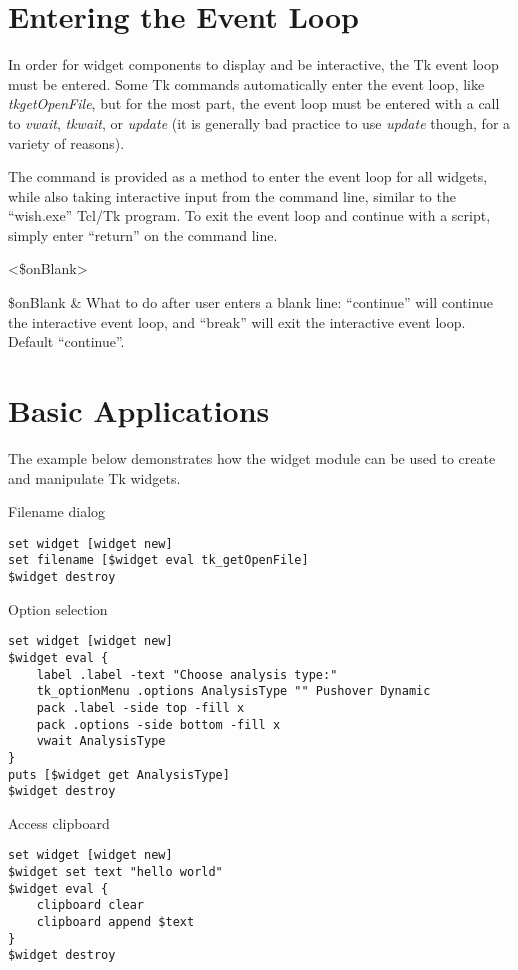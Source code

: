 \documentclass{article}
\renewcommand{\^}[1]{\textsuperscript{#1}}
\renewcommand{\_}[1]{\textsubscript{#1}}
\begin{document}
\section{Entering the Event Loop}
In order for widget components to display and be interactive, the Tk event loop must be entered. 
Some Tk commands automatically enter the event loop, like \textit{tk\textunderscore getOpenFile}, but for the most part, the event loop must be entered with a call to \textit{vwait}, \textit{tkwait}, or \textit{update} (it is generally bad practice to use \textit{update} though, for a variety of reasons). 

The command  is provided as a method to enter the event loop for all widgets, while also taking interactive input from the command line, similar to the ``wish.exe'' Tcl/Tk program.
To exit the event loop and continue with a script, simply enter ``return'' on the command line.
\begin{syntax}
   	 <\$onBlank>
\end{syntax}
\begin{args}
   	\$onBlank & What to do after user enters a blank line: ``continue'' will continue the interactive event loop, and ``break'' will exit the interactive event loop. Default ``continue''.
\end{args}

\clearpage
\section{Basic Applications}
The example below demonstrates how the widget module can be used to create and manipulate Tk widgets.
\begin{example}{Filename dialog}
\begin{lstlisting}
set widget [widget new]
set filename [$widget eval tk_getOpenFile]
$widget destroy
\end{lstlisting}
\end{example}

\begin{example}{Option selection}
\begin{lstlisting}
set widget [widget new]
$widget eval {
	label .label -text "Choose analysis type:"
	tk_optionMenu .options AnalysisType "" Pushover Dynamic
	pack .label -side top -fill x
	pack .options -side bottom -fill x
	vwait AnalysisType
}
puts [$widget get AnalysisType]
$widget destroy
\end{lstlisting}
\end{example}

\begin{example}{Access clipboard}
\begin{lstlisting}
set widget [widget new]
$widget set text "hello world"
$widget eval {
	clipboard clear
	clipboard append $text
}
$widget destroy
\end{lstlisting}
\end{example}
\end{document}
